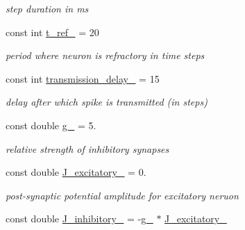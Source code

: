 \begin{DoxyCompactItemize}
\begin{DoxyCompactList}\small\item\em step duration in ms \end{DoxyCompactList}\item 
\hypertarget{classNeuron_ad75d9b1a4f95d1d176b4529e360fc33f}{const int \hyperlink{classNeuron_ad75d9b1a4f95d1d176b4529e360fc33f}{t\-\_\-ref\-\_\-} = 20}\label{classNeuron_ad75d9b1a4f95d1d176b4529e360fc33f}

\begin{DoxyCompactList}\small\item\em period where neuron is refractory in time steps \end{DoxyCompactList}\item 
\hypertarget{classNeuron_ae8b00b2a337c781d383c4c0e0d664563}{const int \hyperlink{classNeuron_ae8b00b2a337c781d383c4c0e0d664563}{transmission\-\_\-delay\-\_\-} = 15}\label{classNeuron_ae8b00b2a337c781d383c4c0e0d664563}

\begin{DoxyCompactList}\small\item\em delay after which spike is transmitted (in steps) \end{DoxyCompactList}\item 
\hypertarget{classNeuron_a10ed61ef202b8d5c1fb9b5692ab81664}{const double \hyperlink{classNeuron_a10ed61ef202b8d5c1fb9b5692ab81664}{g\-\_\-} = 5.}\label{classNeuron_a10ed61ef202b8d5c1fb9b5692ab81664}

\begin{DoxyCompactList}\small\item\em relative strength of inhibitory synapses \end{DoxyCompactList}\item 
\hypertarget{classNeuron_a421f5b5740b099f71b17592bb3d993f5}{const double \hyperlink{classNeuron_a421f5b5740b099f71b17592bb3d993f5}{J\-\_\-excitatory\-\_\-} = 0.}\label{classNeuron_a421f5b5740b099f71b17592bb3d993f5}

\begin{DoxyCompactList}\small\item\em post-\/synaptic potential amplitude for excitatory neruon \end{DoxyCompactList}\item 
\hypertarget{classNeuron_afbe150f19900a1f363c73a5e9ae39267}{const double \hyperlink{classNeuron_afbe150f19900a1f363c73a5e9ae39267}{J\-\_\-inhibitory\-\_\-} = -\/\hyperlink{classNeuron_a10ed61ef202b8d5c1fb9b5692ab81664}{g\-\_\-} $\ast$ \hyperlink{classNeuron_a421f5b5740b099f71b17592bb3d993f5}{J\-\_\-excitatory\-\_\-}}\label{classNeuron_afbe150f19900a1f363c73a5e9ae39267}


\end{DoxyCompactItemize}

